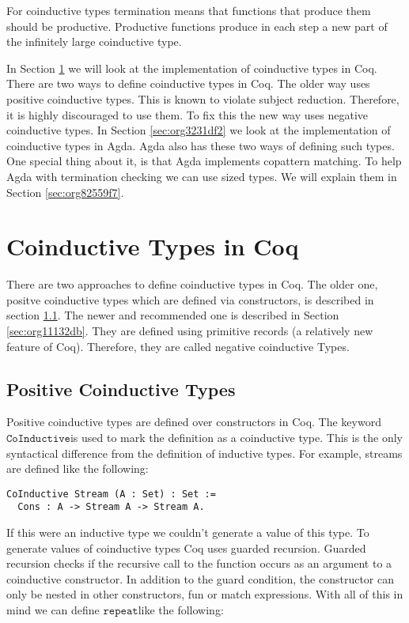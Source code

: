 \documentclass[a4paper,cleardoubleempty,BCOR1cm]{scrbook}
\begin{document}
For coinductive types termination means that functions that produce them
should be productive. Productive functions produce in each step a
new part of the infinitely large coinductive type.

In Section \ref{sec:orgacf8b51} we will look at the implementation of
coinductive types in Coq. There are two ways to define coinductive types in
Coq. The older way uses positive coinductive types. This is known to violate
subject reduction. Therefore, it is highly discouraged to use them. To fix
this the new way uses negative coinductive types. In Section \ref{sec:org3231df2}
we look at the implementation of coinductive types in Agda. Agda also has these two ways of
defining such types. One special thing about it, is that Agda implements
copattern matching. To help Agda with termination checking we can use sized
types. We will explain them in Section \ref{sec:org82559f7}.
\section{Coinductive Types in Coq}
\label{sec:orgacf8b51}
There are two approaches to define coinductive types in Coq. The older one,
positve coinductive types which are defined via constructors, is
described in section \ref{sec:orgc510da0}. The newer and recommended one is
described in Section \ref{sec:org11132db}. They are defined using
primitive records (a relatively new feature of Coq). Therefore, they are
called negative coinductive Types.

\subsection{Positive Coinductive Types}
\label{sec:orgc510da0}
Positive coinductive types are defined over constructors in Coq.  The keyword
\linebreak $\mathtt{CoInductive}$\;is used to mark the definition as a coinductive type.
This is the only syntactical difference from the definition of inductive
types. For example, streams are defined like the following:

\begin{verbatim}
CoInductive Stream (A : Set) : Set :=
  Cons : A -> Stream A -> Stream A.
\end{verbatim}

If this were an inductive type we couldn't generate a value of this type. To
generate values of coinductive types Coq uses guarded recursion. Guarded
recursion checks if the recursive call to the function occurs as an argument
to a coinductive constructor. In addition to the guard condition, the
constructor can only be nested in other constructors, fun or match
expressions. With all of this in mind we can define $\mathtt{repeat}$\;like the
following:
\end{document}

